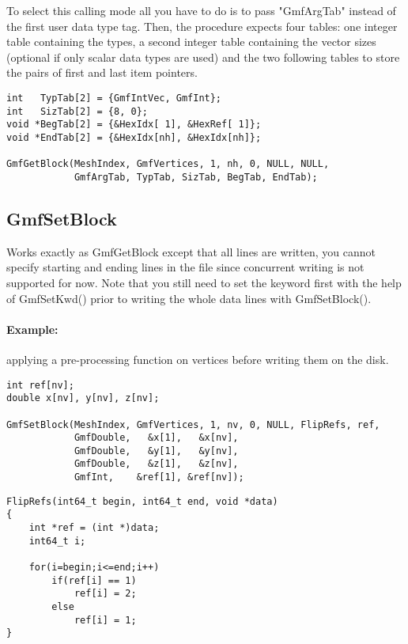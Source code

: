 \documentclass[a4paper,12pt]{article}
\begin{document}
To select this calling mode all you have to do is to pass "GmfArgTab" instead of the first user data type tag.
Then, the procedure expects four tables: one integer table containing the types, a second integer table containing the vector sizes (optional if only scalar data types are used) and the two following tables to store the pairs of first and last item pointers.

\begin{tt}
\begin{verbatim}
int   TypTab[2] = {GmfIntVec, GmfInt};
int   SizTab[2] = {8, 0};
void *BegTab[2] = {&HexIdx[ 1], &HexRef[ 1]};
void *EndTab[2] = {&HexIdx[nh], &HexIdx[nh]};

GmfGetBlock(MeshIndex, GmfVertices, 1, nh, 0, NULL, NULL,
            GmfArgTab, TypTab, SizTab, BegTab, EndTab);
\end{verbatim}
\end{tt}
\normalfont


\subsection{GmfSetBlock}
Works exactly as GmfGetBlock except that all lines are written, you cannot specify starting and ending lines in the file since concurrent writing is not supported for now. Note that you still need to set the keyword first with the help of GmfSetKwd() prior to writing the whole data lines with GmfSetBlock().

\paragraph{Example:} applying a pre-processing function on vertices before writing them on the disk.

\begin{tt}
\begin{verbatim}
int ref[nv];
double x[nv], y[nv], z[nv];

GmfSetBlock(MeshIndex, GmfVertices, 1, nv, 0, NULL, FlipRefs, ref,
            GmfDouble,   &x[1],   &x[nv],
            GmfDouble,   &y[1],   &y[nv],
            GmfDouble,   &z[1],   &z[nv],
            GmfInt,    &ref[1], &ref[nv]);
\end{verbatim}
\end{tt}
\normalfont

\begin{tt}
\begin{verbatim}
FlipRefs(int64_t begin, int64_t end, void *data)
{
    int *ref = (int *)data;
    int64_t i;

    for(i=begin;i<=end;i++)
        if(ref[i] == 1)
            ref[i] = 2;
        else
            ref[i] = 1;
}
\end{verbatim}
\end{tt}
\normalfont
\end{document}
